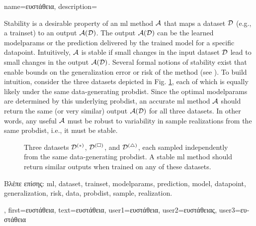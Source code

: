 {name={\foreignlanguage{greek}{ευστάθεια}},
	description={Stability is a desirable property of an \gls{ml} method $\mathcal{A}$ that maps a 
		\gls{dataset} $\mathcal{D}$ (e.g., a \gls{trainset}) to an output $\mathcal{A}(\mathcal{D})$. The output 
		$\mathcal{A}(\mathcal{D})$ can be the learned \glspl{modelparam} or the \gls{prediction} delivered 
		by the trained \gls{model} for a specific \gls{datapoint}. Intuitively, $\mathcal{A}$ is 
		stable if small changes in the input \gls{dataset} $\mathcal{D}$ lead to small changes in the 
		output $\mathcal{A}(\mathcal{D})$. Several formal notions of stability exist that enable bounds 
		on the \gls{generalization} error or \gls{risk} of the method (see \cite[Ch.~13]{ShalevMLBook}).
		To build intuition, consider the three \gls{dataset}s depicted in Fig. \ref{fig_three_data_stability_dict}, each 
		of which is equally likely under the same \gls{data}-generating \gls{probdist}. Since the 
		optimal \glspl{modelparam} are determined by this underlying \gls{probdist}, an accurate 
		\gls{ml} method $\mathcal{A}$ should return the same (or very similar) output $\mathcal{A}(\mathcal{D})$ 
		for all three \gls{dataset}s. In other words, any useful $\mathcal{A}$ must be robust to 
		variability in \gls{sample} \gls{realization}s from the same \gls{probdist}, i.e., it must be stable. 
		\begin{figure}[H]
			\centering
			\caption{Three \gls{dataset}s $\mathcal{D}^{(*)}$, $\mathcal{D}^{(\square)}$, and $\mathcal{D}^{(\triangle)}$, 
				each sampled independently from the same \gls{data}-generating \gls{probdist}. A stable \gls{ml} 
				method should return similar outputs when trained on any of these \gls{dataset}s. \label{fig_three_data_stability_dict}}
		\end{figure}
		\foreignlanguage{greek}{Βλέπε επίσης:} \gls{ml}, \gls{dataset}, \gls{trainset}, \glspl{modelparam}, \gls{prediction}, 
		\gls{model}, \gls{datapoint}, \gls{generalization}, \gls{risk}, \gls{data}, \gls{probdist}, \gls{sample}, \gls{realization}.}, 
	first={\foreignlanguage{greek}{ευστάθεια}}, 
	text={\foreignlanguage{greek}{ευστάθεια}},
	user1={\foreignlanguage{greek}{ευστάθεια}}, %
  	user2={\foreignlanguage{greek}{ευστάθειας}}, %
	user3={\foreignlanguage{greek}{ευστάθεια}} %
}

